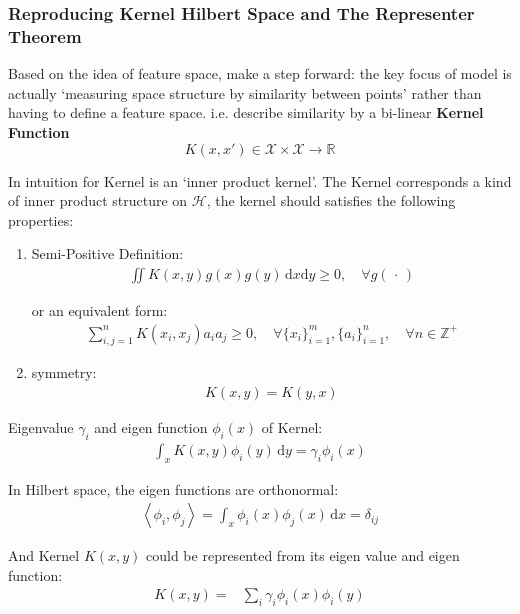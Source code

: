 \subsubsection{Reproducing Kernel Hilbert Space and The Representer Theorem}

    Based on the idea of feature space, make a step forward: the key focus of model is actually `measuring space structure by similarity between points' rather than having to define a feature space. i.e. describe similarity by a bi-linear \textbf{Kernel Function} 
    \[
        K(x,x') \in \mathcal{X}\times \mathcal{X}\to \mathbb{R}
    \]

    In intuition for Kernel is an `inner product kernel'. The Kernel corresponds a kind of inner product structure on $ \mathcal{H} $, the kernel should satisfies the following properties:
\begin{enumerate}[topsep=2pt,itemsep=2pt]
    \item Semi-Positive Definition:
    \begin{align}
        \iint K(x,y)g(x)g(y)\,\mathrm{d}x\mathrm{d}y\geq 0,\quad \forall g(\,\cdot\,)
    \end{align}
    
    or an equivalent form:
    \begin{align}
        \sum_{i,j=1}^n K(x_i,x_j)a_ia_j\geq 0,\quad \forall \{x_i\}_{i=1}^m,\{a_i\}_{i=1}^n,\quad \forall n\in\mathbb{Z}^+ 
    \end{align}
    \item symmetry:
    \begin{align}
        K(x,y)=K(y,x) 
    \end{align}
\end{enumerate}



Eigenvalue $ \gamma _i $ and eigen function $ \phi _i(x) $ of Kernel:
\begin{align}
     \int_x K(x,y) \phi _i(y)\,\mathrm{d}y=\gamma _i\phi_i(x)
\end{align}

    In Hilbert space, the eigen functions are orthonormal:
    \begin{align}
         \left\langle \phi _i,\phi _j\right\rangle = \int _x\phi _i(x)\phi _j(x) \,\mathrm{d}x =\delta _{ij}
    \end{align}

    And Kernel $ K(x,y) $ could be represented from its eigen value and eigen function:
    \begin{align}
        K(x,y)=&\sum_{i}\gamma _i\phi _i(x)\phi _i(y)
    \end{align}

